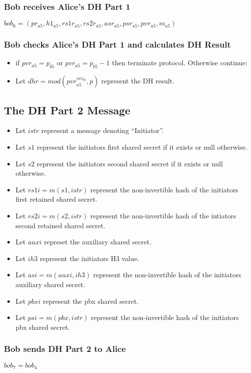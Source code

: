 \documentclass[11pt]{article}
\begin{document}
  \subsubsection{Bob receives Alice's DH Part 1}
  $bob_6=(pr_{a5},h1_{a5},rs1r_{a5},rs2r_{a5},asr_{a5},psr_{a5},
           pvr_{a5},m_{a5})$
  \subsubsection{Bob checks Alice's DH Part 1 and calculates DH 
               Result}
  \begin{itemize}
    \item if $pvr_{a5} = p_{b5}$ or $pvr_{a5} = p_{b5} - 1$ then 
          terminate protocol. Otherwise continue:
    \item Let $dhr = mod(pvr_{a5}^{svi_{b5}},p)$ represent the 
          DH result.
  \end{itemize}
  \subsection{The DH Part 2 Message}
  \begin{itemize}
    \item Let $istr$ represent a message denoting ``Initiator''.
    \item Let $s1$ represent the initiators first shared secret if
          it exists or null otherwise.
    \item Let $s2$ represent the initiators second shared secret if
          it exists or null otherwise.
    \item Let $rs1i = m(s1,istr)$ represent the non-invertible hash 
          of the initiators first retained shared secret.
    \item Let $rs2i = m(s2,istr)$ represent the non-invertible hash
          of the intiators second retained shared secret.
    \item Let $auxi$ represet the auxiliary shared secret.
    \item Let $ih3$ represent the initiators H3 value.
    \item Let $asi = m(auxi,ih3)$ represent the non-invertible hash
          of the initiators auxiliary shared secret.
    \item Let $pbxi$ represent the pbx shared secret.
    \item Let $psi = m(pbx,istr)$ represent the non-invertible
          hash of the initiators pbx shared secret.
  \end{itemize}
  \subsubsection{Bob sends DH Part 2 to Alice}
  $bob_7 = bob_4$
\end{document}
